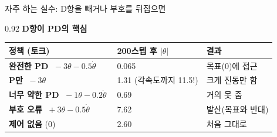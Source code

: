 \begin{frame}{자주 하는 실수: D항을 빼거나 부호를 뒤집으면}
\begin{center}\begin{varwidth}{0.92\textwidth}
  \textbf{D항이 PD의 핵심}
  \begin{tabular}{@{}p{4.2cm}p{3.6cm}p{5.6cm}@{}}
    \toprule
    정책 (토크) & 200스텝 후 $|\theta|$ & 결과 \\
    \midrule
    \textbf{완전한 PD} $\;-3\theta - 0.5\dot\theta\;$ & 0.065 &
      목표(0)에 접근 \\
    \textbf{P만} $\;-3\theta\;$ & 1.31 (각속도까지 11.5!) &
      크게 진동만 함 \\
    \textbf{너무 약한 PD} $\;-1\theta - 0.2\dot\theta\;$ & 0.69 &
      거의 못 줌 \\
    \textbf{부호 오류} $\;+3\theta - 0.5\dot\theta\;$ & 7.62 &
      발산(목표와 반대) \\
    \textbf{제어 없음} (0) & 2.60 & 처음 그대로 \\
    \bottomrule
  \end{tabular}
\end{varwidth}\end{center}
\end{frame}

